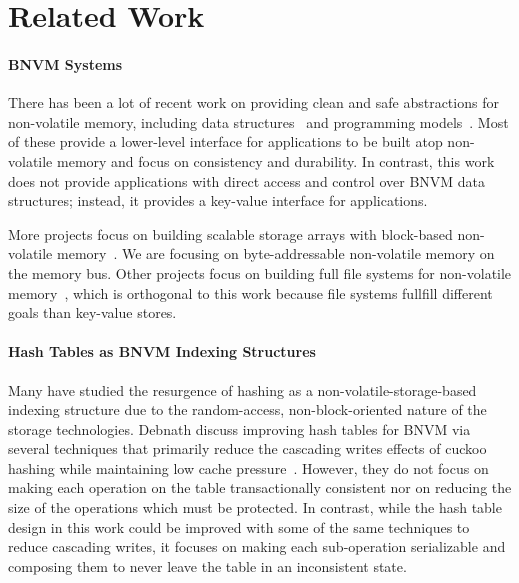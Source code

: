 \section{Related Work}

\paragraph{BNVM Systems}

There has been a lot of recent work on providing clean and safe abstractions for
non-volatile memory, including data
structures~\cite{coburn:asplos11,hu:atc17,Yang:2015,Venkataraman:2011} and programming
models~\cite{ren:micro15,volos:asplos11,condit:sosp09,guerra:atc12,Narayanan:2012}.
Most of these provide a lower-level interface for applications
to be built atop non-volatile memory and focus on consistency and durability. In contrast, this work does not provide
applications with direct access and control over BNVM data structures; instead,
it provides a key-value interface for applications.

More projects focus on building scalable storage arrays with block-based
non-volatile memory~\cite{Marmol:2014,caulfield:micro10,lim:sosp11,wu:atc15,debnath:vldb10}. We are focusing
on byte-addressable non-volatile memory on the memory bus. Other projects focus
on building full file systems for non-volatile
memory~\cite{wu:asplos94,xu:fast16,xu:sosp17,dulloor:eurosys14}, which is orthogonal to this work because file
systems fullfill different goals than key-value stores.

\paragraph{Hash Tables as BNVM Indexing Structures}

Many have studied the resurgence of hashing as a non-volatile-storage-based
indexing structure due to the random-access,
non-block-oriented nature of the storage technologies. Debnath \etal discuss
improving hash tables for BNVM via several techniques that primarily reduce the
cascading writes effects of cuckoo hashing while maintaining low cache
pressure~\cite{Debnath:2016ht}.
However, they do not focus on making each operation on the table transactionally
consistent nor on reducing the size of the operations which must be protected.
In contrast, while the hash table design in this work could be improved with
some of the same techniques to reduce cascading writes, it focuses on making
each sub-operation serializable and composing them to never leave the table in
an inconsistent state.


